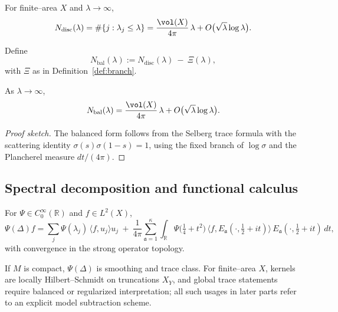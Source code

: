 \begin{theorem}\label{thm:selberg-unbalanced}\relax
For finite–area $X$ and $\lambda\to\infty$,
\[
  N_{\mathrm{disc}}(\lambda)=\#\{j:\lambda_j\le \lambda\}
  = \frac{\vol(X)}{4\pi}\,\lambda + O\big(\sqrt{\lambda}\log\lambda\big).
\]
\end{theorem}

\begin{definition}\label{def:balanced-count}\relax
Define
\[
  N_{\mathrm{bal}}(\lambda):= N_{\mathrm{disc}}(\lambda)\ -\ \Xi(\lambda),
\]
with $\Xi$ as in Definition~\ref{def:branch}. %
\end{definition}

\begin{theorem}\label{thm:balanced-selberg}\relax
As $\lambda\to\infty$,
\[
  N_{\mathrm{bal}}(\lambda)=\frac{\vol(X)}{4\pi}\,\lambda + O\big(\sqrt{\lambda}\log\lambda\big).
\]
\end{theorem}

\begin{proof}[Proof sketch]\relax
The balanced form follows from the Selberg trace formula with the scattering identity $\sigma(s)\sigma(1-s)=1$, using the fixed branch of $\log\sigma$ and the Plancherel measure $dt/(4\pi)$. %
\end{proof}

\subsection{Spectral decomposition and functional calculus}\relax \hspace{0pt}
\label{subsec:decomp-calculus}
\begin{theorem}\label{thm:functional-calculus}\relax
For $\Psi\in C_0^\infty(\mathbb{R})$ and $f\in L^2(X)$,
\[
  \Psi(\Delta)f
  = \sum_{j}\Psi(\lambda_j)\,\langle f,u_j\rangle u_j
  \ +\ \frac{1}{4\pi}\sum_{\mathfrak{a}=1}^{\kappa}\int_{\mathbb{R}}
      \Psi\!\big(\tfrac14+t^2\big)\,
      \langle f,E_{\mathfrak{a}}(\cdot,\tfrac12+it)\rangle\,
      E_{\mathfrak{a}}(\cdot,\tfrac12+it)\,dt,
\]
with convergence in the strong operator topology. %
\end{theorem}

\begin{remark}\label{rem:trace-classes}\relax
If $M$ is compact, $\Psi(\Delta)$ is smoothing and trace class. 
For finite–area $X$, kernels are locally Hilbert–Schmidt on truncations $X_Y$, and global trace statements require balanced or regularized interpretation; all such usages in later parts refer to an explicit model subtraction scheme. %
\end{remark}

